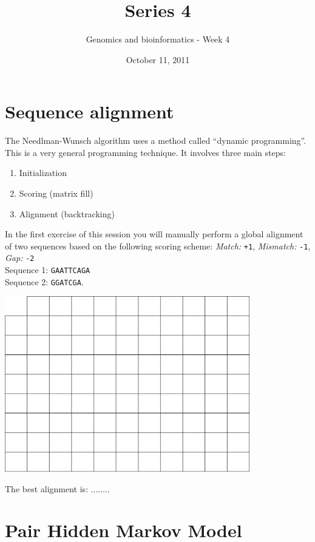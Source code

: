 \documentclass[a4paper,11pt]{article}
\title{Series 4}
\date{October 11, 2011}
\author{Genomics and bioinformatics - Week 4}
\begin{document}
\maketitle




\section{Sequence alignment}
The Needlman-Wunsch algorithm uses a method called ``dynamic programming''. This is a very general programming technique. It involves three main steps:
\begin{enumerate}
\item Initialization
\item Scoring (matrix fill)
\item Alignment (backtracking)
\end{enumerate}
In the first exercise of this session you will manually perform a global alignment of two sequences based on the following scoring scheme:
\emph{Match:} \texttt{+1}, \emph{Mismatch:} \texttt{-1}, \emph{Gap:} \texttt{-2}\\
Sequence 1: \texttt{GAATTCAGA}\\
Sequence 2: \texttt{GGATCGA}.
\vspace{0.5cm}
\begin{center}
\includegraphics[width=0.8\textwidth]{matrix.png}
\end{center}
\vspace{0.5cm}

The best alignment is: ........\\

 
\section{Pair Hidden Markov Model}
\end{document}
